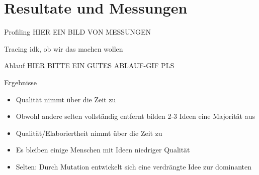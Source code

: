\section{Resultate und Messungen}
\begin{frame} {Profiling}
	HIER EIN BILD VON MESSUNGEN
\end{frame}

\begin{frame} {Tracing}
	idk, ob wir das machen wollen
\end{frame}

\begin{frame} {Ablauf}
	HIER BITTE EIN GUTES ABLAUF-GIF PLS
\end{frame}

\begin{frame} {Ergebnisse}
	\begin{itemize}
		\item Qualität nimmt über die Zeit zu
		\item Obwohl andere selten vollständig entfernt bilden 2-3 Ideen eine Majorität aus
		\item Qualität/Elaboriertheit nimmt über die Zeit zu
		\item Es bleiben einige Menschen mit Ideen niedriger Qualität
		\item Selten: Durch Mutation entwickelt sich eine verdrängte Idee zur dominanten
	\end{itemize}
\end{frame}